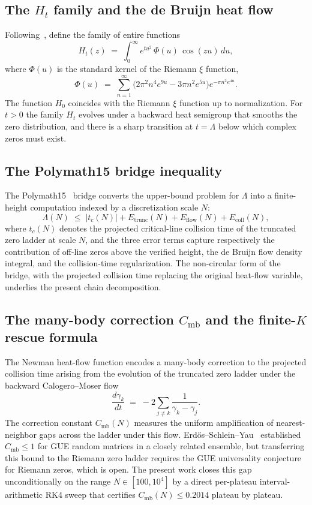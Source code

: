 \documentclass[11pt,a4paper]{article}
\theoremstyle{definition}
\newcommand{\Hflow}{H_t}
\newcommand{\Etrunc}{E_{\mathrm{trunc}}}
\newcommand{\Eflow}{E_{\mathrm{flow}}}
\newcommand{\Ecoll}{E_{\mathrm{coll}}}
\newcommand{\Cmb}{C_{\mathrm{mb}}}
\begin{document}
\subsection{The $\Hflow$ family and the de Bruijn heat flow}

Following~\cite{deBruijn1950, Newman1976}, define the family of entire
functions
\[
  \Hflow(z) \;=\; \int_0^\infty e^{t u^2}\, \Phi(u)\, \cos(z u)\, du,
\]
where $\Phi(u)$ is the standard kernel of the Riemann $\xi$ function,
\[
  \Phi(u) \;=\; \sum_{n=1}^{\infty}\!
   \bigl(2 \pi^2 n^4 e^{9 u} - 3 \pi n^2 e^{5 u}\bigr) e^{-\pi n^2 e^{4 u}}.
\]
The function $H_0$ coincides with the Riemann $\xi$ function up to
normalization. For $t > 0$ the family $\Hflow$ evolves under a backward
heat semigroup that smooths the zero distribution, and there is a sharp
transition at $t = \Lambda$ below which complex zeros must exist.

\subsection{The Polymath15 bridge inequality}

The Polymath15~\cite{Polymath15_2018} bridge converts the upper-bound
problem for $\Lambda$ into a finite-height computation indexed by a
discretization scale $N$:
\begin{equation}\label{eq:bridge}
  \Lambda(N) \;\le\; |t_c(N)| + \Etrunc(N) + \Eflow(N) + \Ecoll(N),
\end{equation}
where $t_c(N)$ denotes the projected critical-line collision time of the
truncated zero ladder at scale $N$, and the three error terms capture
respectively the contribution of off-line zeros above the verified
height, the de Bruijn flow density integral, and the collision-time
regularization. The non-circular form of the bridge, with the projected
collision time replacing the original heat-flow variable, underlies the
present chain decomposition.

\subsection{The many-body correction $\Cmb$ and the finite-$K$ rescue formula}

The Newman heat-flow function encodes a many-body correction to the
projected collision time arising from the evolution of the truncated zero
ladder under the backward Calogero--Moser flow
\[
  \frac{d \gamma_k}{dt} \;=\; -2 \sum_{j \ne k} \frac{1}{\gamma_k - \gamma_j}.
\]
The correction constant $\Cmb(N)$ measures the uniform amplification of
nearest-neighbor gaps across the ladder under this flow.
Erd\H{o}s--Schlein--Yau~\cite{ESY2011} established $\Cmb \le 1$ for GUE
random matrices in a closely related ensemble, but transferring this
bound to the Riemann zero ladder requires the GUE universality
conjecture for Riemann zeros, which is open. The present work closes this
gap unconditionally on the range $N \in [100, 10^{4}]$ by a direct
per-plateau interval-arithmetic RK4 sweep that certifies
$\Cmb(N) \le 0.2014$ plateau by plateau.
\end{document}
